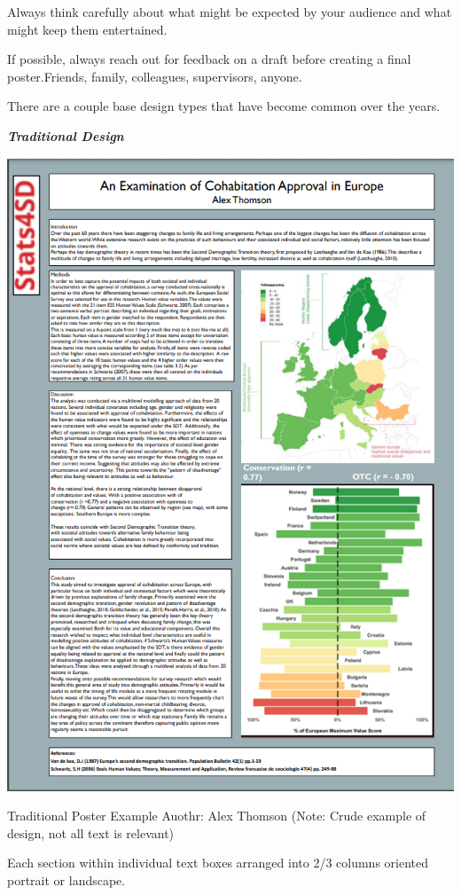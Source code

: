 \documentclass[
]{book}
\begin{document}
Always think carefully about what might be expected by your audience and what might keep them entertained.

If possible, always reach out for feedback on a draft before creating a final poster.Friends, family, colleagues, supervisors, anyone.

There are a couple base design types that have become common over the years.

\textbf{\emph{Traditional Design}}

\begin{center}\includegraphics[width=9.6in]{img/trad example 1} \end{center}

Traditional Poster Example Auothr: Alex Thomson (Note: Crude example of design, not all text is relevant)

Each section within individual text boxes arranged into 2/3 columns oriented portrait or landscape.
\end{document}

